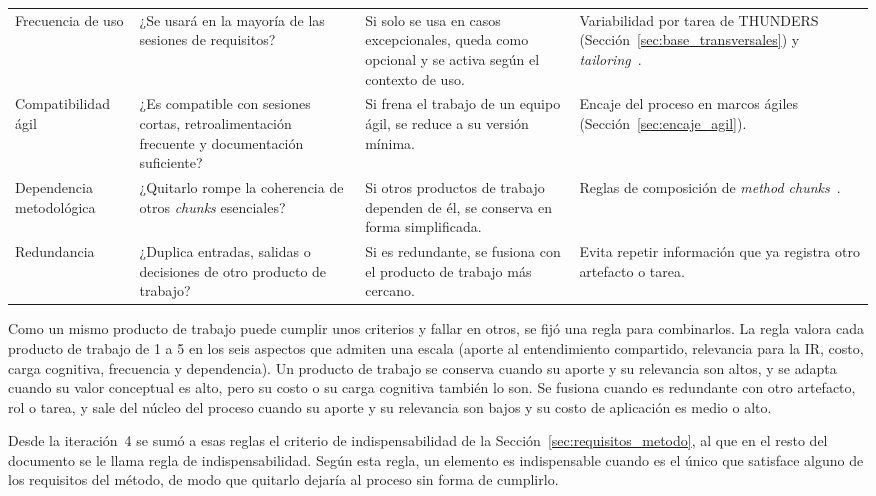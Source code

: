 \documentclass[12pt,letterpaper,oneside]{report}
\begin{document}
{\begin{xltabular}{\textwidth}{@{}L{2.7cm}Y L{3.6cm}L{2.7cm}@{}}
\addlinespace
Frecuencia de uso & ¿Se usará en la mayoría de las sesiones de requisitos? &
Si solo se usa en casos excepcionales, queda como opcional y se activa según el
contexto de uso. & Variabilidad por tarea de THUNDERS
(Sección~\ref{sec:base_transversales}) y \textit{tailoring}~\cite{kalus2013tailoring}. \\
\addlinespace
Compatibilidad ágil & ¿Es compatible con sesiones cortas, retroalimentación
frecuente y documentación suficiente? & Si frena el trabajo de un equipo ágil,
se reduce a su versión mínima. & Encaje del proceso en marcos ágiles
(Sección~\ref{sec:encaje_agil}). \\
\addlinespace
Dependencia metodológica & ¿Quitarlo rompe la coherencia de otros
\textit{chunks} esenciales? & Si otros productos de trabajo dependen de él, se conserva
en forma simplificada. & Reglas de composición de \textit{method
chunks}~\cite{ralyte2001assembly}. \\
\addlinespace
Redundancia & ¿Duplica entradas, salidas o decisiones de otro producto de trabajo? & Si
es redundante, se fusiona con el producto de trabajo más cercano. & Evita repetir
información que ya registra otro artefacto o tarea. \\
\end{xltabular}}

Como un mismo producto de trabajo puede cumplir unos criterios y fallar en otros, se
fijó una regla para combinarlos. La regla valora cada producto de trabajo de 1 a 5 en
los seis aspectos que admiten una escala (aporte al entendimiento compartido,
relevancia para la IR, costo, carga cognitiva, frecuencia y dependencia). Un
producto de trabajo se conserva cuando su aporte y su relevancia son altos, y se adapta
cuando su valor conceptual es alto, pero su costo o su carga cognitiva también
lo son. Se fusiona cuando es redundante con otro artefacto, rol o tarea, y sale
del núcleo del proceso cuando su aporte y su relevancia son bajos y su costo de aplicación
es medio o alto.

Desde la iteración~4 se sumó a esas reglas el criterio de indispensabilidad de
la Sección~\ref{sec:requisitos_metodo}, al que en el resto del documento se le
llama regla de indispensabilidad. Según esta regla, un elemento es indispensable 
cuando es el único que satisface alguno de los requisitos
del método, de modo que quitarlo dejaría al proceso sin forma de cumplirlo.
\end{document}
